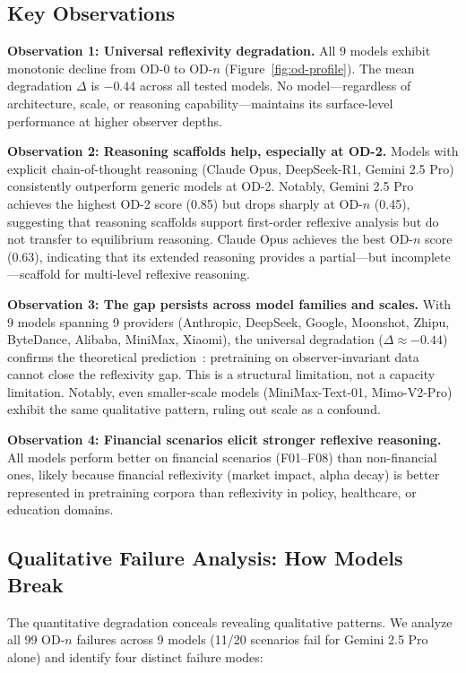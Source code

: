 \documentclass{article}
\begin{document}
\subsection{Key Observations}

\textbf{Observation 1: Universal reflexivity degradation.} All 9 models exhibit monotonic decline from OD-0 to OD-$n$ (Figure~\ref{fig:od-profile}). The mean degradation $\Delta$ is $-0.44$ across all tested models. No model---regardless of architecture, scale, or reasoning capability---maintains its surface-level performance at higher observer depths.

\textbf{Observation 2: Reasoning scaffolds help, especially at OD-2.} Models with explicit chain-of-thought reasoning (Claude Opus, DeepSeek-R1, Gemini 2.5 Pro) consistently outperform generic models at OD-2. Notably, Gemini 2.5 Pro achieves the highest OD-2 score (0.85) but drops sharply at OD-$n$ (0.45), suggesting that reasoning scaffolds support first-order reflexive analysis but do not transfer to equilibrium reasoning. Claude Opus achieves the best OD-$n$ score (0.63), indicating that its extended reasoning provides a partial---but incomplete---scaffold for multi-level reflexive reasoning.

\textbf{Observation 3: The gap persists across model families and scales.} With 9 models spanning 9 providers (Anthropic, DeepSeek, Google, Moonshot, Zhipu, ByteDance, Alibaba, MiniMax, Xiaomi), the universal degradation ($\Delta \approx -0.44$) confirms the theoretical prediction~\citep{anon2026}: pretraining on observer-invariant data cannot close the reflexivity gap. This is a structural limitation, not a capacity limitation. Notably, even smaller-scale models (MiniMax-Text-01, Mimo-V2-Pro) exhibit the same qualitative pattern, ruling out scale as a confound.

\textbf{Observation 4: Financial scenarios elicit stronger reflexive reasoning.} All models perform better on financial scenarios (F01--F08) than non-financial ones, likely because financial reflexivity (market impact, alpha decay) is better represented in pretraining corpora than reflexivity in policy, healthcare, or education domains.

\subsection{Qualitative Failure Analysis: How Models Break}

The quantitative degradation conceals revealing qualitative patterns. We analyze all 99 OD-$n$ failures across 9 models (11/20 scenarios fail for Gemini 2.5 Pro alone) and identify four distinct failure modes:
\end{document}
